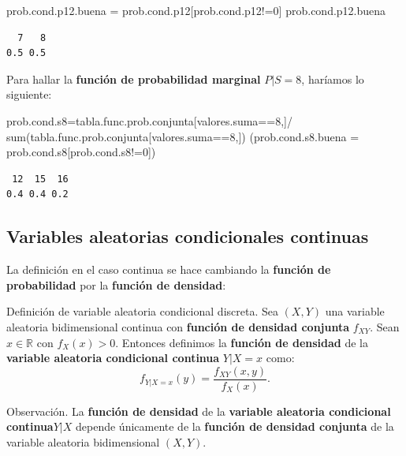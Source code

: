 \documentclass[
  letterpaper,
  DIV=11,
  numbers=noendperiod]{scrreprt}
\newenvironment{Shaded}{\begin{snugshade}}{\end{snugshade}}
\newcommand{\AttributeTok}[1]{\textcolor[rgb]{0.40,0.45,0.13}{#1}}
\newcommand{\DecValTok}[1]{\textcolor[rgb]{0.68,0.00,0.00}{#1}}
\newcommand{\FunctionTok}[1]{\textcolor[rgb]{0.28,0.35,0.67}{#1}}
\newcommand{\NormalTok}[1]{\textcolor[rgb]{0.00,0.23,0.31}{#1}}
\newcommand{\OtherTok}[1]{\textcolor[rgb]{0.00,0.23,0.31}{#1}}
\newcommand{\SpecialCharTok}[1]{\textcolor[rgb]{0.37,0.37,0.37}{#1}}
\begin{document}
\begin{Shaded}
\begin{Highlighting}[]
\NormalTok{prob.cond.p12.buena }\OtherTok{=}\NormalTok{ prob.cond.p12[prob.cond.p12}\SpecialCharTok{!=}\DecValTok{0}\NormalTok{]}
\NormalTok{prob.cond.p12.buena}
\end{Highlighting}
\end{Shaded}

\begin{verbatim}
  7   8 
0.5 0.5 
\end{verbatim}

Para hallar la \textbf{función de probabilidad marginal} \(P|S=8\),
haríamos lo siguiente:

\begin{Shaded}
\begin{Highlighting}[]
\NormalTok{prob.cond.s8}\OtherTok{=}\NormalTok{tabla.func.prob.conjunta[valores.suma}\SpecialCharTok{==}\DecValTok{8}\NormalTok{,]}\SpecialCharTok{/}
  \FunctionTok{sum}\NormalTok{(tabla.func.prob.conjunta[valores.suma}\SpecialCharTok{==}\DecValTok{8}\NormalTok{,])}
\NormalTok{(}\AttributeTok{prob.cond.s8.buena =}\NormalTok{ prob.cond.s8[prob.cond.s8}\SpecialCharTok{!=}\DecValTok{0}\NormalTok{])}
\end{Highlighting}
\end{Shaded}

\begin{verbatim}
 12  15  16 
0.4 0.4 0.2 
\end{verbatim}

\hypertarget{variables-aleatorias-condicionales-continuas}{%
\subsection{Variables aleatorias condicionales
continuas}\label{variables-aleatorias-condicionales-continuas}}

La definición en el caso continua se hace cambiando la \textbf{función
de probabilidad} por la \textbf{función de densidad}:

Definición de variable aleatoria condicional discreta. Sea \((X,Y)\) una
variable aleatoria bidimensional continua con \textbf{función de
densidad conjunta} \(f_{XY}\). Sean \(x\in\mathbb{R}\) con \(f_X(x)>0\).
Entonces definimos la \textbf{función de densidad} de la
\textbf{variable aleatoria condicional continua} \(Y|X=x\) como: \[
f_{Y|X=x}(y)=\frac{f_{XY}(x,y)}{f_X(x)}.
\]

Observación. La \textbf{función de densidad} de la \textbf{variable
aleatoria condicional continua\(Y|X\)} depende únicamente de la
\textbf{función de densidad conjunta} de la variable aleatoria
bidimensional \((X,Y)\).
\end{document}
